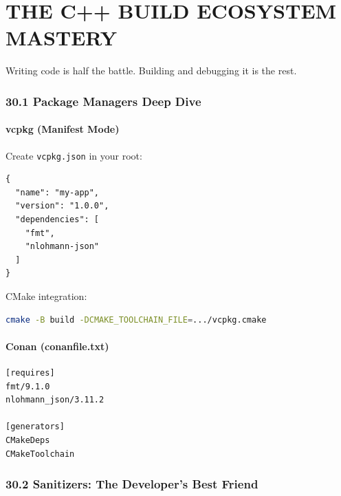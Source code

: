 \hypertarget{the-c-build-ecosystem-mastery}{%
\chapter{THE C++ BUILD ECOSYSTEM
MASTERY}\label{the-c-build-ecosystem-mastery}}

Writing code is half the battle. Building and debugging it is the rest.

\hypertarget{package-managers-deep-dive}{%
\subsection{30.1 Package Managers Deep
Dive}\label{package-managers-deep-dive}}

\hypertarget{vcpkg-manifest-mode}{%
\subsubsection{vcpkg (Manifest Mode)}\label{vcpkg-manifest-mode}}

Create \passthrough{\lstinline!vcpkg.json!} in your root:

\begin{lstlisting}
{
  "name": "my-app",
  "version": "1.0.0",
  "dependencies": [
    "fmt",
    "nlohmann-json"
  ]
}
\end{lstlisting}

CMake integration:

\begin{lstlisting}[language=bash]
cmake -B build -DCMAKE_TOOLCHAIN_FILE=.../vcpkg.cmake
\end{lstlisting}

\hypertarget{conan-conanfile.txt}{%
\subsubsection{Conan (conanfile.txt)}\label{conan-conanfile.txt}}

\begin{lstlisting}
[requires]
fmt/9.1.0
nlohmann_json/3.11.2

[generators]
CMakeDeps
CMakeToolchain
\end{lstlisting}

\hypertarget{sanitizers-the-developers-best-friend}{%
\subsection{30.2 Sanitizers: The Developer's Best
Friend}\label{sanitizers-the-developers-best-friend}}

